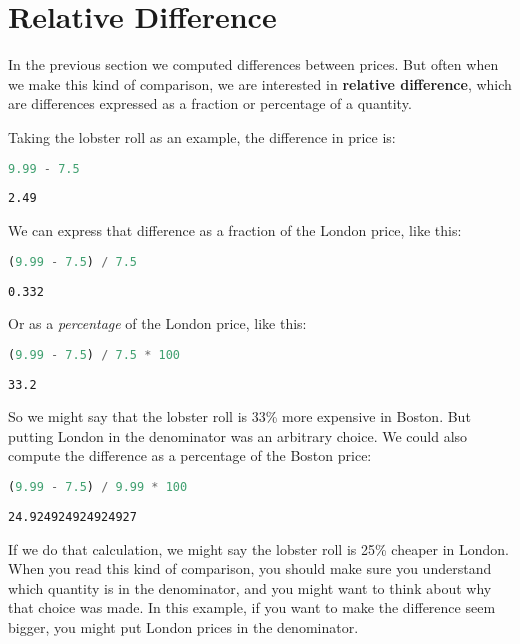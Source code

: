 \hypertarget{relative-difference}{%
\section{Relative Difference}\label{relative-difference}}

In the previous section we computed differences between prices. But
often when we make this kind of comparison, we are interested in
\textbf{relative difference}, which are differences expressed as a
fraction or percentage of a quantity.

Taking the lobster roll as an example, the difference in price is:

\begin{lstlisting}[language=Python]
9.99 - 7.5
\end{lstlisting}

\begin{lstlisting}[]
2.49
\end{lstlisting}

We can express that difference as a fraction of the London price, like
this:

\begin{lstlisting}[language=Python]
(9.99 - 7.5) / 7.5
\end{lstlisting}

\begin{lstlisting}[]
0.332
\end{lstlisting}

Or as a \emph{percentage} of the London price, like this:

\begin{lstlisting}[language=Python]
(9.99 - 7.5) / 7.5 * 100
\end{lstlisting}

\begin{lstlisting}[]
33.2
\end{lstlisting}

So we might say that the lobster roll is 33\% more expensive in Boston.
But putting London in the denominator was an arbitrary choice. We could
also compute the difference as a percentage of the Boston price:

\begin{lstlisting}[language=Python]
(9.99 - 7.5) / 9.99 * 100
\end{lstlisting}

\begin{lstlisting}[]
24.924924924924927
\end{lstlisting}

If we do that calculation, we might say the lobster roll is 25\% cheaper
in London. When you read this kind of comparison, you should make sure
you understand which quantity is in the denominator, and you might want
to think about why that choice was made. In this example, if you want to
make the difference seem bigger, you might put London prices in the
denominator.

